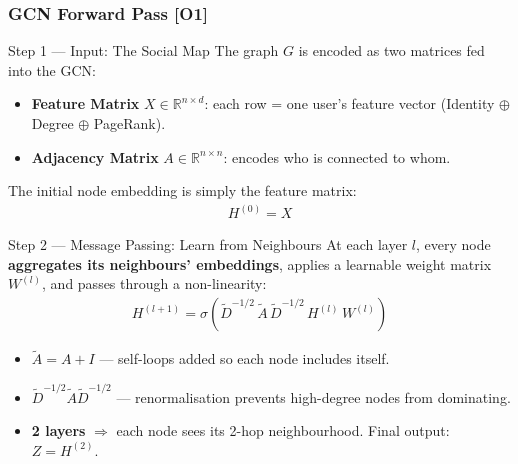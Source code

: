 \documentclass[10pt,aspectratio=43]{beamer}
\begin{document}
\begin{frame}
\frametitle{GCN Forward Pass \textbf{[O1]}}

\begin{block}{Step 1 --- Input: The Social Map}
\small
The graph $G$ is encoded as two matrices fed into the GCN:
\begin{itemize}
  \small
  \item \alert{\textbf{Feature Matrix}} $X \in \mathbb{R}^{n \times d}$: each row = one user's feature vector (Identity $\oplus$ Degree $\oplus$ PageRank).
  \item \alert{\textbf{Adjacency Matrix}} $A \in \mathbb{R}^{n \times n}$: encodes who is connected to whom.
\end{itemize}
\vspace{0.2em}
The initial node embedding is simply the feature matrix:
\begin{align*}
  H^{(0)} = X
\end{align*}
\end{block}

\vspace{0.2em}

\begin{exampleblock}{Step 2 --- Message Passing: Learn from Neighbours}
\small
At each layer $l$, every node \textbf{aggregates its neighbours' embeddings}, applies a learnable weight matrix $W^{(l)}$, and passes through a non-linearity:
\begin{align*}
  H^{(l+1)} = \sigma\!\left(\tilde{D}^{-1/2}\,\tilde{A}\,\tilde{D}^{-1/2}\,H^{(l)}\,W^{(l)}\right)
\end{align*}
\begin{itemize}
  \small
  \item $\tilde{A} = A + I$ \;--- self-loops added so each node includes itself.
  \item $\tilde{D}^{-1/2}\tilde{A}\tilde{D}^{-1/2}$ \;--- \alert{renormalisation} prevents high-degree nodes from dominating.
  \item \textbf{2 layers} $\Rightarrow$ each node sees its \alert{2-hop neighbourhood}.
  Final output: $Z = H^{(2)}$.
\end{itemize}
\end{exampleblock}

\end{frame}
\end{document}
